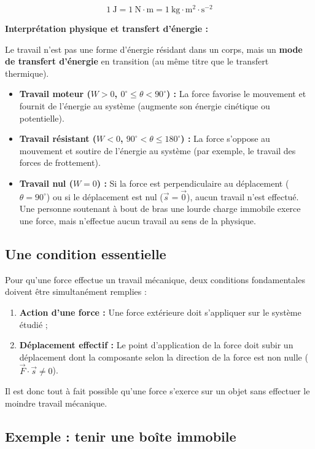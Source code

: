 \documentclass[11pt,openany]{book}
\begin{document}
\[
\boxed{1\ \mathrm{J} = 1\ \mathrm{N \cdot m} = 1\ \mathrm{kg \cdot m^2 \cdot s^{-2}}}
\]

\textbf{Interprétation physique et transfert d'énergie :}

Le travail n'est pas une forme d'énergie résidant dans un corps, mais un \textbf{mode de transfert d'énergie} en transition (au même titre que le transfert thermique). 

\begin{itemize}
    \item \textbf{Travail moteur ($W > 0$, $0^\circ \le \theta < 90^\circ$) :} La force favorise le mouvement et fournit de l'énergie au système (augmente son énergie cinétique ou potentielle).
    \item \textbf{Travail résistant ($W < 0$, $90^\circ < \theta \le 180^\circ$) :} La force s'oppose au mouvement et soutire de l'énergie au système (par exemple, le travail des forces de frottement).
    \item \textbf{Travail nul ($W = 0$) :} Si la force est perpendiculaire au déplacement ($\theta = 90^\circ$) ou si le déplacement est nul ($\vec{s} = \vec{0}$), aucun travail n'est effectué. Une personne soutenant à bout de bras une lourde charge immobile exerce une force, mais n'effectue aucun travail au sens de la physique.
\end{itemize}

\subsection{Une condition essentielle}

Pour qu'une force effectue un travail mécanique, deux conditions fondamentales doivent être simultanément remplies :

\begin{enumerate}
    \item \textbf{Action d'une force :} Une force extérieure doit s'appliquer sur le système étudié ;
    \item \textbf{Déplacement effectif :} Le point d'application de la force doit subir un déplacement dont la composante selon la direction de la force est non nulle ($\vec{F} \cdot \vec{s} \neq 0$).
\end{enumerate}

Il est donc tout à fait possible qu'une force s'exerce sur un objet sans effectuer le moindre travail mécanique.

\subsection{Exemple : tenir une boîte immobile}
\end{document}
